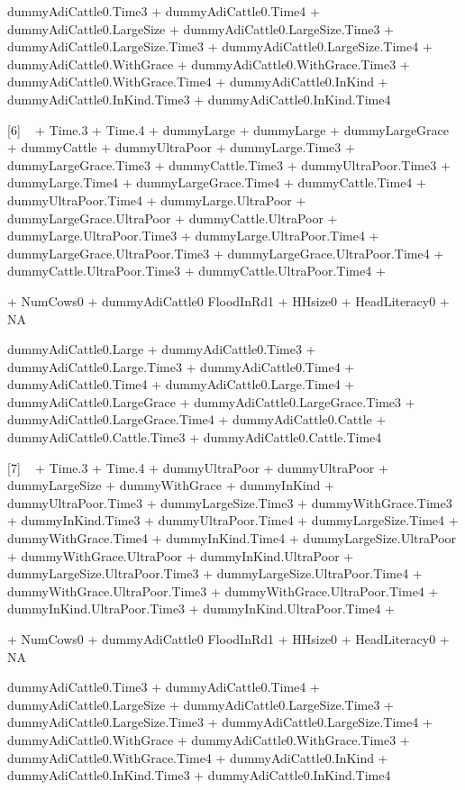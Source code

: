 \begin{Schunk}
\begin{Soutput}
dummyAdiCattle0.Time3 + dummyAdiCattle0.Time4 + dummyAdiCattle0.LargeSize + dummyAdiCattle0.LargeSize.Time3
 + dummyAdiCattle0.LargeSize.Time3 + dummyAdiCattle0.LargeSize.Time4 + dummyAdiCattle0.WithGrace
 + dummyAdiCattle0.WithGrace.Time3 + dummyAdiCattle0.WithGrace.Time4 + dummyAdiCattle0.InKind
 + dummyAdiCattle0.InKind.Time3 + dummyAdiCattle0.InKind.Time4

 

[6]
 ~  + Time.3 + Time.4 + dummyLarge
 + dummyLarge + dummyLargeGrace + dummyCattle
 + dummyUltraPoor + dummyLarge.Time3 + dummyLargeGrace.Time3
 + dummyCattle.Time3 + dummyUltraPoor.Time3 + dummyLarge.Time4
 + dummyLargeGrace.Time4 + dummyCattle.Time4 + dummyUltraPoor.Time4
 + dummyLarge.UltraPoor + dummyLargeGrace.UltraPoor + dummyCattle.UltraPoor
 + dummyLarge.UltraPoor.Time3 + dummyLarge.UltraPoor.Time4 + dummyLargeGrace.UltraPoor.Time3
 + dummyLargeGrace.UltraPoor.Time4 + dummyCattle.UltraPoor.Time3 + dummyCattle.UltraPoor.Time4
 + 

 + NumCows0
 + dummyAdiCattle0
FloodInRd1 + HHsize0 + HeadLiteracy0 + NA

dummyAdiCattle0.Large + dummyAdiCattle0.Time3 + dummyAdiCattle0.Large.Time3 + dummyAdiCattle0.Time4
 + dummyAdiCattle0.Time4 + dummyAdiCattle0.Large.Time4 + dummyAdiCattle0.LargeGrace
 + dummyAdiCattle0.LargeGrace.Time3 + dummyAdiCattle0.LargeGrace.Time4 + dummyAdiCattle0.Cattle
 + dummyAdiCattle0.Cattle.Time3 + dummyAdiCattle0.Cattle.Time4

 

[7]
 ~  + Time.3 + Time.4 + dummyUltraPoor
 + dummyUltraPoor + dummyLargeSize + dummyWithGrace
 + dummyInKind + dummyUltraPoor.Time3 + dummyLargeSize.Time3
 + dummyWithGrace.Time3 + dummyInKind.Time3 + dummyUltraPoor.Time4
 + dummyLargeSize.Time4 + dummyWithGrace.Time4 + dummyInKind.Time4
 + dummyLargeSize.UltraPoor + dummyWithGrace.UltraPoor + dummyInKind.UltraPoor
 + dummyLargeSize.UltraPoor.Time3 + dummyLargeSize.UltraPoor.Time4 + dummyWithGrace.UltraPoor.Time3
 + dummyWithGrace.UltraPoor.Time4 + dummyInKind.UltraPoor.Time3 + dummyInKind.UltraPoor.Time4
 + 

 + NumCows0
 + dummyAdiCattle0
FloodInRd1 + HHsize0 + HeadLiteracy0 + NA

dummyAdiCattle0.Time3 + dummyAdiCattle0.Time4 + dummyAdiCattle0.LargeSize + dummyAdiCattle0.LargeSize.Time3
 + dummyAdiCattle0.LargeSize.Time3 + dummyAdiCattle0.LargeSize.Time4 + dummyAdiCattle0.WithGrace
 + dummyAdiCattle0.WithGrace.Time3 + dummyAdiCattle0.WithGrace.Time4 + dummyAdiCattle0.InKind
 + dummyAdiCattle0.InKind.Time3 + dummyAdiCattle0.InKind.Time4

 
\end{Soutput}
\end{Schunk}





